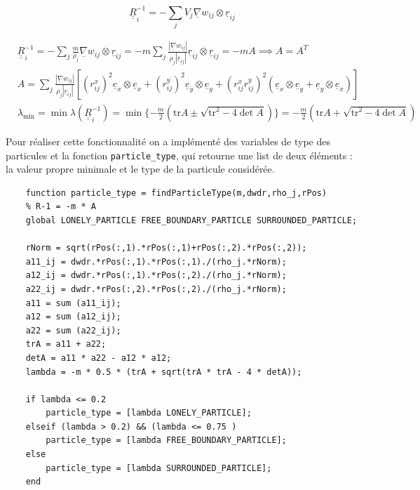 \documentclass{article}
\newcommand\ul[1]{\underline{#1}}
\newcommand\uul[1]{\underline{\underline{#1}}}
\newcommand\uex{\ul{e}_x}
\newcommand\uey{\ul{e}_y}
\begin{document}
\begin{equation}
	\uul{R}_i^{-1} = - \sum_{j} V_j \ul{\nabla} w_{ij} \otimes \ul{r}_{ij}
\end{equation}

\begin{align*}
	& \uul{R}_i^{-1} = - \sum_{j} \frac{m}{\rho_j} \ul{\nabla} w_{ij} \otimes \ul{r}_{ij} = - m \sum_{j} 
	\frac{| \ul{\nabla} w_{ij} |}{\rho_j |\ul{r}_{ij} |} \ul{r}_{ij} \otimes \ul{r}_{ij} = -m A \implies A = A^T \\
	& A = \sum_j \frac{| \ul{\nabla} w_{ij} |}{\rho_j |\ul{r}_{ij} |} \left[ (r_{ij}^x)^2 \uex \otimes \uex + (r_{ij}^y)^2 \uey \otimes \uey + (r_{ij}^x r_{ij}^y)^2 (\uex \otimes \uey + \uey \otimes \uex) \right] \\ 
	& \lambda_{\min} = \min\lambda(\uul{R}_i^{-1}) = \min\{ -\frac{m}{2} (\mathrm{tr} A \pm \sqrt{\mathrm{tr}^2 - 4 \det A}) \} = -\frac{m}{2} (\mathrm{tr} A + \sqrt{\mathrm{tr}^2 - 4 \det A})
\end{align*}

Pour réaliser cette fonctionnalité on a implémenté des variables de type des particules et la fonction \lstinline$particle_type$, qui retourne une list de deux éléments : la valeur propre minimale et le type de la particule considérée.  
\lstset{language=matlab}   
\begin{lstlisting}           
	function particle_type = findParticleType(m,dwdr,rho_j,rPos)
    % R-1 = -m * A 
    global LONELY_PARTICLE FREE_BOUNDARY_PARTICLE SURROUNDED_PARTICLE;

    rNorm = sqrt(rPos(:,1).*rPos(:,1)+rPos(:,2).*rPos(:,2)); 
    a11_ij = dwdr.*rPos(:,1).*rPos(:,1)./(rho_j.*rNorm); 
    a12_ij = dwdr.*rPos(:,1).*rPos(:,2)./(rho_j.*rNorm); 
    a22_ij = dwdr.*rPos(:,2).*rPos(:,2)./(rho_j.*rNorm); 
    a11 = sum (a11_ij);
    a12 = sum (a12_ij);
    a22 = sum (a22_ij);
    trA = a11 + a22;
    detA = a11 * a22 - a12 * a12;
    lambda = -m * 0.5 * (trA + sqrt(trA * trA - 4 * detA));

    if lambda <= 0.2 
        particle_type = [lambda LONELY_PARTICLE];
    elseif (lambda > 0.2) && (lambda <= 0.75 ) 
        particle_type = [lambda FREE_BOUNDARY_PARTICLE];
    else 
        particle_type = [lambda SURROUNDED_PARTICLE];
    end
\end{lstlisting} 
\end{document}

